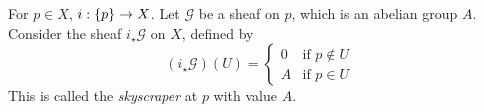 For \( p \in X \), \( i : \qty{p} \to X \).
Let \( \mathcal G \) be a sheaf on \( p \), which is an abelian group \( A \).
Consider the sheaf \( i_\star \mathcal G \) on \( X \), defined by
\[ (i_\star \mathcal G)(U) = \begin{cases}
    0 & \text{if } p \notin U \\
    A & \text{if } p \in U
\end{cases} \]
This is called the \emph{skyscraper} at \( p \) with value \( A \).
